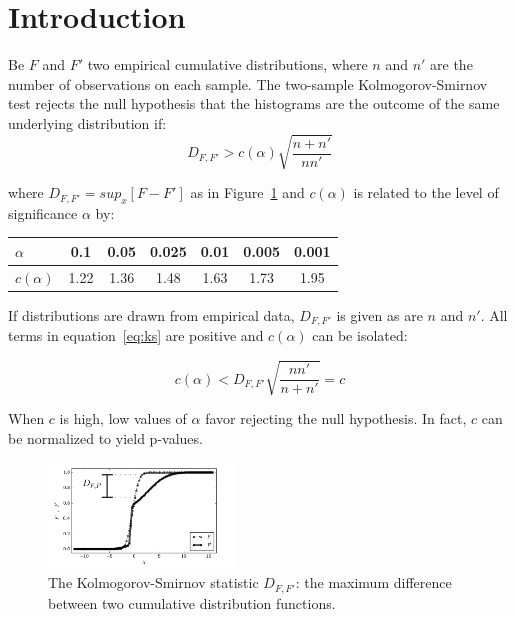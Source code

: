 \documentclass[%
	aip,
	jmp,%
	amsmath,amssymb,
	reprint,%
]{revtex4-1}
\begin{document}
\tableofcontents


\section{Introduction}\label{sec:intro}



Be $F$ and $F'$ two empirical cumulative distributions,
where $n$ and $n'$ are the number of observations on each sample.
The two-sample Kolmogorov-Smirnov test rejects the null hypothesis
that the histograms are the outcome of the same underlying distribution
if:
\begin{equation}\label{eq:ks}
D_{F,F'} > c(\alpha)\sqrt{\frac{n+n'}{nn'}}
\end{equation}

\noindent where $D_{F,F'}=sup_x[F-F']$ as in Figure~\ref{fig:dnn}
and $c(\alpha)$ is related to the level of significance $\alpha$ by:

\begin{table}[h!]
\centering
\begin{tabular}{|l||c|c|c|c|c|c|}\hline
$\alpha$    & 0.1  & 0.05 & 0.025 & 0.01 & 0.005 & 0.001 \\\hline
$c(\alpha)$ & 1.22 & 1.36 & 1.48  & 1.63 & 1.73  & 1.95  \\\hline
\end{tabular}
\end{table}

If distributions are drawn from empirical data, $D_{F,F'}$ is given as are $n$ and $n'$.
All terms in equation~\ref{eq:ks} are positive and $c(\alpha)$ can be isolated:

\begin{equation}\label{eq:ks2}
	c(\alpha) < D_{F,F'}\sqrt{\frac{nn'}{n+n'}} = c
\end{equation}

When $c$ is high, low values of $\alpha$ favor rejecting the null hypothesis.
In fact, $c$ can be normalized to yield p-values.

\begin{figure}[!h]
	\centering
	\includegraphics[width=0.44\textwidth]{figs/Dnn}
	\caption{The Kolmogorov-Smirnov statistic $D_{F,F'}$: the maximum difference between
		two cumulative distribution functions.}
	\label{fig:dnn}
\end{figure}
\end{document}
